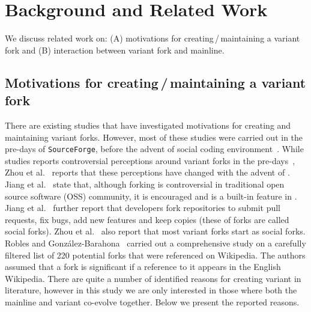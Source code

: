 \section{Background and Related Work}
\label{sec:background}
We discuss related work on: (A) motivations for creating\,/\,maintaining a variant fork and (B) interaction between variant fork and mainline.%

\subsection{Motivations for creating\,/\,maintaining a variant fork}
\label{sec:motivations}
There are existing studies that have investigated motivations for creating and maintaining variant forks. However, most of these studies were carried out in the pre-\gh days of \texttt{SourceForge}, before the advent of social coding environment~\cite{Linus:2012Perspectives,Gregorio:2012,Viseur:2012Forks,Linus:2013CodeForking,Laurent:2008,Linus:2011ToFork}. While studies reports controversial perceptions around variant forks in the pre-\gh days~\cite{Chua:Forking:2017,Dixion:2009Forks,Ernst:2010,Linus:2011ToFork,Linus:2014Hackers,Raymond:Cathedral:2001,pete}, Zhou et al.~\cite{Zhou:2020} reports that these perceptions have changed with the advent of \gh. 
Jiang et al.~\cite{Lo:2017} state that, although forking is controversial in traditional open source software (OSS) community, it is encouraged and is a built-in feature in \gh. 
Jiang et al.~\cite{Lo:2017} further report that developers fork repositories to submit pull requests, fix bugs, add new features and keep copies (these of forks are called social forks). Zhou et al.~\cite{Zhou:2020} also report that most variant forks start as social forks. 
Robles and Gonz{\'a}lez-Barahona~\cite{Gregorio:2012} carried out a comprehensive study on a carefully filtered list of 220 potential forks that were referenced on Wikipedia. The authors assumed that a fork is significant if a reference to it appears in the English Wikipedia.
There are quite a number of identified reasons for creating variant in literature, however in this study we are only interested in those where both the mainline and variant co-evolve together. Below we present the reported reasons. 

